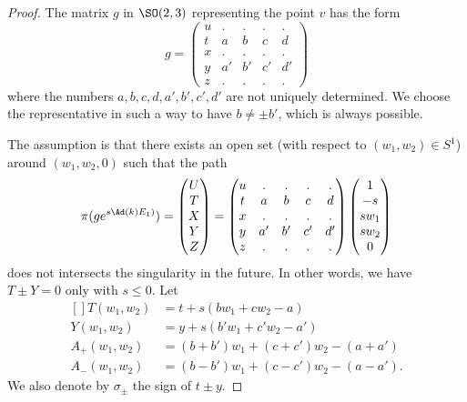 	\begin{proof}
		The matrix $g$ in $\SO(2,3)$ representing the point $v$ has the form
		\begin{equation}
			g=\begin{pmatrix}
				u & .  & .  & .  & .  \\
				t & a  & b  & c  & d  \\
				x & .  & .  & .  & .  \\
				y & a' & b' & c' & d' \\
				z & .  & .  & .  & .
			\end{pmatrix}
		\end{equation}
		where the numbers $a,b,c,d,a',b',c',d'$ are not uniquely determined. We choose the representative in such a way to have $b\neq \pm b'$, which is always possible.

		The assumption is that there exists an open set (with respect to $(w_1,w_2)\in S^1$) around $(w_1,w_2,0)$ such that the path
		\begin{equation}		\label{EqPathgexpUTXYZ}
			\pi(g e^{s\Ad\left( k \right)E_1)})=
			\begin{pmatrix}
				U \\
				T \\
				X \\
				Y \\
				Z
			\end{pmatrix}=
			\begin{pmatrix}
				u & .  & .  & .  & .  \\
				t & a  & b  & c  & d  \\
				x & .  & .  & .  & .  \\
				y & a' & b' & c' & d' \\
				z & .  & .  & .  & .
			\end{pmatrix}
			\begin{pmatrix}
				1    \\
				-s   \\
				sw_1 \\
				sw_2 \\
				0
			\end{pmatrix}
		\end{equation}
		does not intersects the singularity in the future. In other words, we have $T\pm Y=0$ only with $s\leq 0$. Let
		\begin{equation}
			\begin{aligned}[]
				T(w_1,w_2)   & =t+s(bw_1+cw_2-a)            \\
				Y(w_1,w_2)   & =y+s(b'w_1+c'w_2-a')         \\
				A_+(w_1,w_2) & =(b+b')w_1+(c+c')w_2-(a+a')  \\
				A_-(w_1,w_2) & =(b-b')w_1+(c-c')w_2-(a-a').
			\end{aligned}
		\end{equation}
		We also denote by $\sigma_{\pm}$ the sign of $t\pm y$.


\end{proof}
